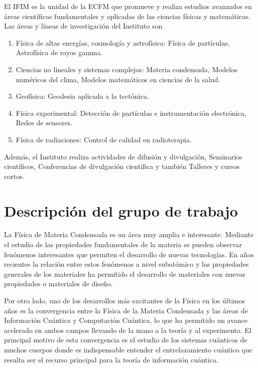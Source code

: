 \documentclass[titlepage,11pt]{article}
\begin{document}
El IFIM es la unidad de la ECFM que promueve y realiza estudios avanzados en
áreas científicas fundamentales y aplicadas de las ciencias físicas y
matemáticas.  Las áreas y líneas de investigación del Instituto son
\begin{enumerate}
\item Física de altas energías, cosmología y astrofísica: Física de
  partículas, Astrofísica de rayos gamma.
\item Ciencias no lineales y sistemas complejos: Materia condensada, Modelos
  numéricos del clima, Modelos matemáticos en ciencias de la salud.
\item Geofísica: Geodesia aplicada a la tectónica.
\item Física experimental: Detección de partículas e instrumentación
  electrónica, Redes de sensores.
\item Física de radiaciones: Control de calidad en radioterapia.
\end{enumerate}

Además, el Instituto realiza actividades de difusión y divulgación, Seminarios
científicos, Conferencias de divulgación científica y también Talleres y
cursos cortos.


\section{Descripción del grupo de trabajo}
\label{sec:grupo}
La Física de Materia Condensada es un área muy amplia e interesante. Mediante
el estudio de las propiedades fundamentales de la materia se pueden observar
fenómenos interesantes que permiten el desarrollo de nuevas tecnologías. En
años recientes la relación entre estos fenómenos a nivel subatómico y las
propiedades generales de los materiales ha permitido el desarrollo de
materiales con nuevas propiedades o materiales de diseño.

Por otro lado, uno de los desarrollos más excitantes de la Física en los
últimos años es la convergencia entre la Física de la Materia Condensada y las
áreas de Información Cuántica y Computación Cuántica, lo que ha permitido un
avance acelerado en ambos campos llevando de la mano a la teoría y al
experimento. El principal motivo de esta convergencia es el estudio de los
sistemas cuánticos de muchos cuerpos donde es indispensable entender el
entrelazamiento cuántico que resulta ser el recurso principal para la teoría
de información cuántica.
\end{document}

